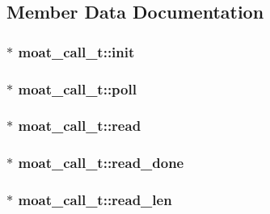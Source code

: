 \subsection{Member Data Documentation}
\hypertarget{structmoat__call__t_a883c0fc11905fceaf1a8e720acfabef6}{
\subsubsection[{init}]{$\ast$ moat\-\_\-call\-\_\-t\-::init}}\label{structmoat__call__t_a883c0fc11905fceaf1a8e720acfabef6}
\hypertarget{structmoat__call__t_a5ddda0c0889ec1f54c869ce3770258b4}{
\subsubsection[{poll}]{$\ast$ moat\-\_\-call\-\_\-t\-::poll}}\label{structmoat__call__t_a5ddda0c0889ec1f54c869ce3770258b4}
\hypertarget{structmoat__call__t_a3bc9153322aa3df0bb573d04ce425db9}{
\subsubsection[{read}]{$\ast$ moat\-\_\-call\-\_\-t\-::read}}\label{structmoat__call__t_a3bc9153322aa3df0bb573d04ce425db9}
\hypertarget{structmoat__call__t_a521a394e58d41f5f171402674107d054}{
\subsubsection[{read\-\_\-done}]{$\ast$ moat\-\_\-call\-\_\-t\-::read\-\_\-done}}\label{structmoat__call__t_a521a394e58d41f5f171402674107d054}
\hypertarget{structmoat__call__t_a3092921758d95baf09cf3d489574ac3a}{
\subsubsection[{read\-\_\-len}]{$\ast$ moat\-\_\-call\-\_\-t\-::read\-\_\-len}}\label{structmoat__call__t_a3092921758d95baf09cf3d489574ac3a}
